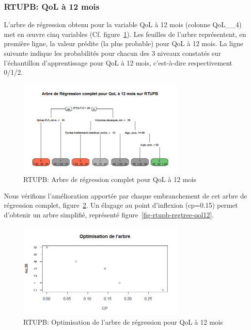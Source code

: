 \subsubsection{RTUPB: QoL à 12 mois}

L'arbre de régression obtenu pour la variable QoL à 12 mois (colonne QoL\_\_4) met en {\oe}uvre cinq variables (Cf. figure~\ref{fig-rtupb-full-regtree-qol12}). Les feuilles de l'arbre représentent, en première ligne, la valeur prédite (la plus probable) pour QoL à 12 mois. La ligne suivante indique les probabilités pour chacun des 3 niveaux constatés sur l'échantillon d'apprentissage pour QoL à 12 mois, c'est-à-dire respectivement 0/1/2. 

\begin{figure}[H]
\centering
\includegraphics[width=0.75\textwidth]{../Fig/RTUPB/rtupb-full-regtree-qol12.png}
\caption{RTUPB: Arbre de régression complet pour QoL à 12 mois}
\label{fig-rtupb-full-regtree-qol12}
\end{figure}

Nous vérifions l'amélioration apportée par chaque embranchement de cet arbre de régression complet, figure~\ref{fig-rtupb-regtree-optim-qol12}. Un élagage au point d'inflexion (cp=0.15) permet d'obtenir un arbre simplifié, représenté figure~\ref{fig-rtupb-regtree-qol12}.

\begin{figure}[H]
\centering
\includegraphics[width=0.75\textwidth]{../Fig/RTUPB/rtupb-regtree-optim-qol12.png}
\caption{RTUPB: Optimisation de l'arbre de régression pour QoL à 12 mois}
\label{fig-rtupb-regtree-optim-qol12}
\end{figure}

